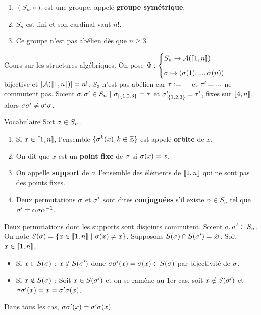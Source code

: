 \documentclass[11pt]{article}
\begin{document}
\begin{prop}{}{}
    \begin{enumerate}[topsep=0pt,itemsep=-0.9 ex]
        \item $(S_n, \circ)$ est une groupe, appelé \textbf{groupe symétrique}.
        \item $S_n$ est fini et son cardinal vaut $n!$.
        \item Ce groupe n'est pas abélien dès que $n\geq3$.
    \end{enumerate}
    \tcblower
     Cours sur les structures algébriques.\n
     On pose $\Phi:\begin{cases}S_n \to \mathcal{A}(\lb1,n\rb)\n\s\mapsto(\s(1),...,\s(n))\end{cases}$ bijective et $|\mathcal{A}(\llbracket1,n\rrbracket)|=n!$.\n
     $S_3$ n'est pas abélien car $\tau:=...$ et $\tau'=...$ ne commutent pas.\n
    Soient $\sigma,\sigma'\in S_n ~ | ~ \sigma_{|\{1,2,3\}}=\tau$ et $\sigma'_{|\{1,2,3\}}=\tau'$, fixes sur $\llbracket4,n\rrbracket$, alors $\sigma\sigma'\neq\sigma'\sigma$.
\end{prop}

\begin{defi}{Vocabulaire}{}
    Soit $\sigma\in S_n$.
    \begin{enumerate}[topsep=0pt,itemsep=-0.9 ex]
        \item Si $x\in\llbracket1,n\rrbracket$, l'ensemble $\{\sigma^k(x),k\in\mathbb{Z}\}$ est appelé \textbf{orbite} de $x$.
        \item On dit que $x$ est un \textbf{point fixe} de $\sigma$ si $\sigma(x)=x$. 
        \item On appelle \textbf{support} de $\sigma$ l'ensemble des éléments de $\llbracket1,n\rrbracket$ qui ne sont pas des points fixes.
        \item Deux permutations $\sigma$ et $\sigma'$ sont dites \textbf{conjuguées} s'il existe $\alpha\in S_n$ tel que $\sigma'=\alpha\sigma\alpha^{-1}$.
    \end{enumerate}

\end{defi}

\begin{prop}{}{}
    Deux permutations dont les supports sont disjoints commutent.
    \tcblower
    Soient $\sigma,\sigma'\in S_n$. On note $S(\sigma)=\{x \in \llbracket1,n\rrbracket ~ | ~ \sigma(x)\neq x\}$.\n
    Supposons $S(\sigma)\cap S(\sigma') = \varnothing$.\n
    Soit $x\in\llbracket1,n\rrbracket$.
    \begin{itemize}
        \item Si $x\in S(\sigma)$ : $x\notin S(\sigma')$ donc $\sigma\sigma'(x)=\sigma(x)\in S(\sigma)$ par bijectivité de $\sigma$.
        \item Si $x\notin S(\sigma)$ : Soit $x\in S(\sigma')$ et on se ramène au 1er cas, soit $x\notin S(\sigma')$ et $\sigma\sigma'(x)=x=\sigma'\sigma(x)$.
    \end{itemize}
    Dans tous les cas, $\sigma\sigma'(x)=\sigma'\sigma(x)$
\end{prop}
\end{document}
